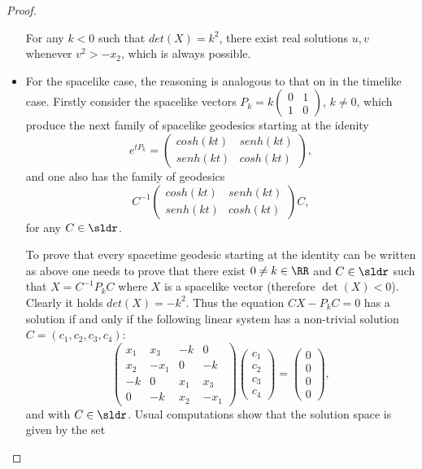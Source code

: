 \documentclass[11pt]{amsart}
\theoremstyle{plain}
\theoremstyle{definition}
\theoremstyle{remark}
\begin{document}
\begin{proof}
\begin{itemize}
 For any $k<0$ such that $det(X)=k^2$, there exist real solutions $u,v$  whenever $v^2 > -x_2$, which is always possible. 
 

\smallskip

\item For the spacelike case, the reasoning is analogous to that on in the timelike case. Firstly consider the spacelike vectors $P_k=k \left( \begin{array}{ccc}
0 & 1 \\
1 & 0 \end{array} \right)$, $k \neq 0$, which produce the next family of spacelike geodesics starting at the idenity
$$e^{tP_k}=\left( \begin{array}{ccc}
cosh(k t) & senh(kt) \\ 
senh(kt) & cosh(kt) \end{array} \right), $$
and one also has the family of geodesics 
$$C^{-1} \left( \begin{array}{ccc}
cosh(k t) & senh(kt) \\ 
senh(kt) & cosh(kt) \end{array} \right) C,$$
for any $C \in \sldr$.

To prove that every spacetime geodesic starting at the identity can be written as  above  one needs to prove that there exist  $0 \neq k \in \RR$ and $C \in \sldr$ such that   $X = C^{-1} P_k C$ where $X$ is a spacelike vector (therefore $\det(X)< 0$). Clearly it holds  $det(X)=-k^2$. Thus the equation 
 $C X - P_k C = 0$ has a solution if and only if the following linear system has a non-trivial solution $C=(c_1,c_2,c_3,c_4)$:
\[\left( \begin{matrix}
x_1 & x_3  & -k & 0 \\
x_2 & -x_1  & 0 & -k \\
-k & 0  & x_1 & x_3 \\
0 & -k  & x_2 & -x_1 
\end{matrix} \right)
\left( \begin{matrix}
c_1 \\
c_2 \\
c_3 \\
c_4
\end{matrix} \right)=
\left( \begin{matrix}
0 \\
0 \\
0 \\
0
\end{matrix} \right),
\]
and with $C\in \sldr$. Usual computations show that the solution space is given by the set


\end{itemize}
\end{proof}
\end{document}
